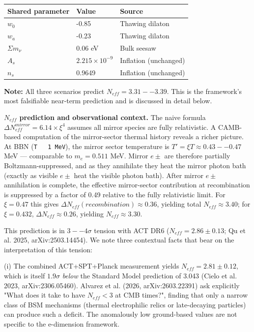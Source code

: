 \documentclass[aps,prd,preprint,superscriptaddress,longbibliography]{revtex4-2}
\begin{document}
\begin{table}[H]
\begin{ruledtabular}
\begin{tabular}{p{5.0cm}p{5.0cm}p{5.0cm}}
Shared parameter & Value & Source \\
\hline
$w_{0}$ & -0.85 & Thawing dilaton \\
$w_a$ & -0.23 & Thawing dilaton \\
$\Sigma m_\nu$ & 0.06 eV & Bulk seesaw \\
$A_s$ & $2.215\times10^{-9}$ & Inflation (unchanged) \\
$n_s$ & 0.9649 & Inflation (unchanged) \\
\end{tabular}
\end{ruledtabular}
\end{table}

\textbf{Note:} All three scenarios predict $N_{eff} = 3.31--3.39$. This is the framework's most falsifiable near-term prediction and is discussed in detail below.

\textbf{$N_{eff}$ prediction and observational context.} The naive formula $\Delta N_{eff}^{mirror} = 6.14 \times \xi^{4}$ assumes all mirror species are fully relativistic. A CAMB-based computation of the mirror-sector thermal history reveals a richer picture. At BBN (\texttt{T ~ 1 MeV}), the mirror sector temperature is $T' = \xi T \approx 0.43--0.47$ MeV --- comparable to $m_e = 0.511$ MeV. Mirror $e\pm$ are therefore partially Boltzmann-suppressed, and as they annihilate they heat the mirror photon bath (exactly as visible $e\pm$ heat the visible photon bath). After mirror $e\pm$ annihilation is complete, the effective mirror-sector contribution at recombination is suppressed by a factor of 0.49 relative to the fully relativistic limit. For $\xi = 0.47$ this gives $\Delta N_{eff}(recombination) \approx 0.36$, yielding total $N_{eff} \approx 3.40$; for $\xi = 0.432$, $\Delta N_{eff} \approx 0.26$, yielding $N_{eff} \approx 3.30$.

This prediction is in $3--4\sigma$ tension with ACT DR6 ($N_{eff} = 2.86 \pm 0.13$; Qu et al. 2025, arXiv:2503.14454). We note three contextual facts that bear on the interpretation of this tension:

(i) The combined ACT+SPT+Planck measurement yields $N_{eff} = 2.81 \pm 0.12$, which is itself $1.9\sigma$ \textit{below} the Standard Model prediction of 3.043 (Cielo et al. 2023, arXiv:2306.05460). Alvarez et al. (2026, arXiv:2603.22391) ask explicitly "What does it take to have $N_{eff} < 3$ at CMB times?", finding that only a narrow class of BSM mechanisms (thermal electrophilic relics or late-decaying particles) can produce such a deficit. The anomalously low ground-based values are not specific to the e-dimension framework.
\end{document}
